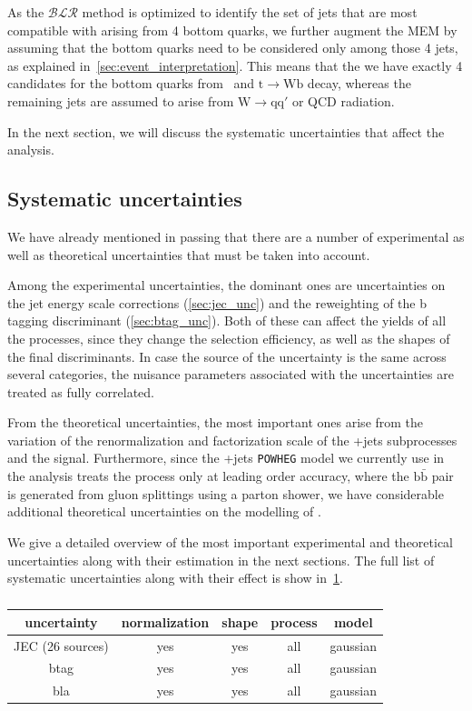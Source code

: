 As the $\mathcal{BLR}$ method is optimized to identify the set of jets that are most compatible with arising from 4 bottom quarks, we further augment the MEM by assuming that the bottom quarks need to be considered only among those 4 jets, as explained in~\cref{sec:event_interpretation}. This means that the we have exactly 4 candidates for the bottom quarks from \Hbb~and $\mathrm{t} \rightarrow \mathrm{W} \mathrm{b}$ decay, whereas the remaining jets are assumed to arise from $\mathrm{W} \rightarrow \mathrm{q} \mathrm{q}'$ or QCD radiation. 

In the next section, we will discuss the systematic uncertainties that affect the analysis.

\subsection{Systematic uncertainties}
\label{sec:systematic_unc}
We have already mentioned in passing that there are a number of experimental as well as theoretical uncertainties that must be taken into account.

Among the experimental uncertainties, the dominant ones are uncertainties on the jet energy scale corrections (\cref{sec:jec_unc}) and the reweighting of the b tagging discriminant (\cref{sec:btag_unc}). Both of these can affect the yields of all the processes, since they change the selection efficiency, as well as the shapes of the final discriminants. In case the source of the uncertainty is the same across several categories, the nuisance parameters associated with the uncertainties are treated as fully correlated.

From the theoretical uncertainties, the most important ones arise from the variation of the renormalization and factorization scale of the \ttbar+jets subprocesses and the \ttH signal. Furthermore, since the \ttbar+jets \texttt{POWHEG} model we currently use in the analysis treats the \ttbb process only at leading order accuracy, where the $\mathrm{b}\bar{\mathrm{b}}$ pair is generated from gluon splittings using a parton shower, we have considerable additional theoretical uncertainties on the modelling of \ttbb.

We give a detailed overview of the most important experimental and theoretical uncertainties along with their estimation in the next sections. The full list of systematic uncertainties along with their effect is show in~\cref{tab:systematic_uncertainties}.

\begin{table}[h!]

\begin{center}
\caption{}
\label{tab:systematic_uncertainties}
\begin{tabular}{c|cccc}
\hline
uncertainty & normalization & shape & process & model \\
\hline
JEC (26 sources) & yes & yes & all & gaussian \\
btag & yes & yes & all & gaussian \\
\hline
bla & yes & yes & all & gaussian \\
\hline
\hline
\end{tabular}
\end{center}
\end{table}

